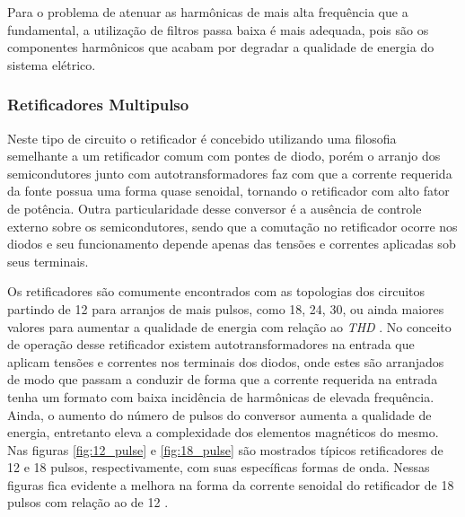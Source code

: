 Para o problema de atenuar as harmônicas de mais alta frequência que a fundamental, a utilização de filtros passa baixa é mais adequada, pois são os componentes harmônicos que acabam por degradar a qualidade de energia do sistema elétrico. 

\subsubsection{Retificadores Multipulso}

Neste tipo de circuito o retificador é concebido utilizando uma filosofia semelhante a um retificador comum com pontes de diodo, porém o arranjo dos semicondutores junto com autotransformadores faz com que a corrente requerida da fonte possua uma forma quase senoidal, tornando o retificador com alto fator de potência. Outra particularidade desse conversor é a ausência de controle externo sobre os semicondutores, sendo que a comutação no retificador ocorre nos diodos e seu funcionamento depende apenas das tensões e correntes aplicadas sob seus terminais.

Os retificadores são comumente encontrados com as topologias dos circuitos partindo de 12 para arranjos de mais pulsos, como 18, 24, 30, ou ainda maiores valores para aumentar a qualidade de energia com relação ao \textit{THD} \cite{Singh2008}. No conceito de operação desse retificador existem autotransformadores na entrada que aplicam tensões e correntes nos terminais dos diodos, onde estes são arranjados de modo que passam a conduzir de forma que a corrente requerida na entrada tenha um formato com baixa incidência de harmônicas de elevada frequência. Ainda, o aumento do número de pulsos do conversor aumenta a qualidade de energia, entretanto eleva a complexidade dos elementos magnéticos do mesmo. Nas figuras \ref{fig:12_pulse} e \ref{fig:18_pulse} são mostrados típicos retificadores de 12 e 18 pulsos, respectivamente, com suas específicas formas de onda. Nessas figuras fica evidente a melhora na forma da corrente senoidal do retificador de 18 pulsos com relação ao de 12 \cite{Singh2008}.


